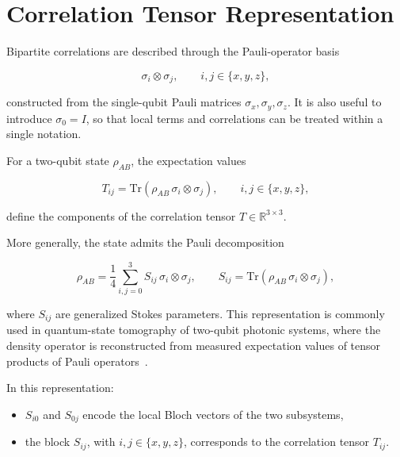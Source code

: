 
\section{Correlation Tensor Representation}

Bipartite correlations are described through the Pauli-operator basis

\[
\sigma_i \otimes \sigma_j,
\qquad
i,j \in \{x,y,z\},
\]

constructed from the single-qubit Pauli matrices \( \sigma_x, \sigma_y, \sigma_z \). It is also useful to introduce \( \sigma_0 = I \), so that local terms and correlations can be treated within a single notation.

\medskip

For a two-qubit state \( \rho_{AB} \), the expectation values

\begin{equation}
T_{ij}
=
\mathrm{Tr}
\left(
\rho_{AB}\,
\sigma_i \otimes \sigma_j
\right),
\qquad
i,j \in \{x,y,z\},
\label{eq:correlation_tensor_components}
\end{equation}

define the components of the correlation tensor \( T \in \mathbb{R}^{3 \times 3} \).

\medskip

More generally, the state admits the Pauli decomposition

\begin{equation}
\rho_{AB}
=
\frac{1}{4}
\sum_{i,j=0}^{3}
S_{ij}\,
\sigma_i \otimes \sigma_j,
\qquad
S_{ij}
=
\mathrm{Tr}
\left(
\rho_{AB}\,
\sigma_i \otimes \sigma_j
\right),
\label{eq:two_qubit_pauli_decomposition}
\end{equation}

where \( S_{ij} \) are generalized Stokes parameters. This representation is commonly used in quantum-state tomography of two-qubit photonic systems, where the density operator is reconstructed from measured expectation values of tensor products of Pauli operators~\cite{altepeter_james_kwiat_quantum_state_tomography}.

In this representation:
\begin{itemize}
    \item \( S_{i0} \) and \( S_{0j} \) encode the local Bloch vectors of the two subsystems,
    \item the block \( S_{ij} \), with \( i,j \in \{x,y,z\} \), corresponds to the correlation tensor \( T_{ij} \).
\end{itemize}

